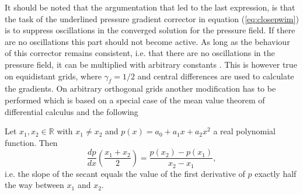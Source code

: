 It should be noted that the argumentation that led to the last expression, is that the task of the underlined pressure gradient corrector in equation (\ref{eq:closepwim}) is to suppress oscillations in the converged solution for the pressure field. If there are no oscillations this part should not become active. As long as the behaviour of this corrector remains consistent, i.e. that there are no oscillations in the pressure field, it can be multiplied with arbitrary constants \cite{ferziger02}. This is however true on equidistant grids, where \(\gamma_f = 1/2\) and central differences are used to calculate the gradients. On arbitrary orthogonal grids another modification has to be performed which is based on a special case of the mean value theorem of differential calculus and the following 
\begin{prop}
  Let \(x_1,x_2 \in \mathbb{R}\) with \(x_1 \neq x_2\) and \(p(x) = a_0 + a_1 x + a_2 x^2\) a real polynomial function. Then 
  \begin{displaymath}
    \frac{dp}{dx}\left(\frac{x_1+x_2}{2}\right) = \frac{p(x_2) - p(x_1)}{x_2 - x_1},
  \end{displaymath}
  i.e. the slope of the secant equals the value of the first derivative of \(p\) exactly half the way between \(x_1\) and \(x_2\).
\end{prop}

